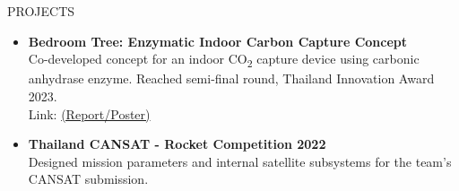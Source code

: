 \documentclass[11pt]{resume} %
\begin{document}
\begin{rSection}{PROJECTS}
\begin{itemize}[leftmargin=*]
        \item \textbf{Bedroom Tree: Enzymatic Indoor Carbon Capture Concept} \\
        Co-developed concept for an indoor CO\textsubscript{2} capture device using carbonic anhydrase enzyme.
        Reached semi-final round, Thailand Innovation Award 2023. \\ Link: \href{https://drive.google.com/drive/folders/1dhCghwObwPUjqy_nS9IBs_KgzmB4loTb?usp=sharing}{(Report/Poster)}

        \item \textbf{Thailand CANSAT - Rocket Competition 2022} \\
        Designed mission parameters and internal satellite subsystems for the team's CANSAT submission.

    \end{itemize}
\end{rSection}
\end{document}
